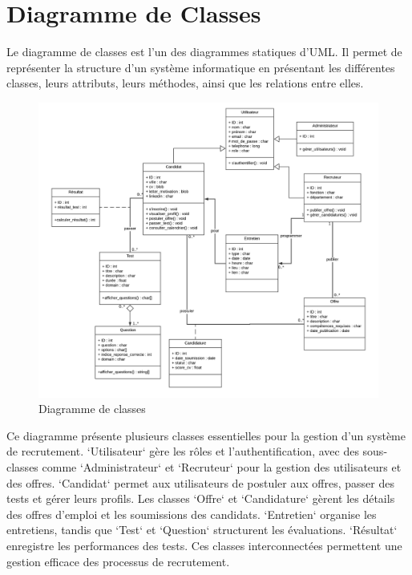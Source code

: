 \section{Diagramme de Classes}
Le diagramme de classes est l'un des diagrammes statiques d'UML. 
Il permet de représenter la structure d'un système informatique en 
présentant les différentes classes, leurs attributs, leurs méthodes, 
ainsi que les relations entre elles.

\begin{figure}[htbp]
   \centering
   \includegraphics[scale=0.6]{diag/class2.png} %
   \caption{Diagramme de classes}
   \label{fig:ClassDiag}
\end{figure}

Ce diagramme présente plusieurs classes essentielles pour la gestion d'un système de recrutement. `Utilisateur` gère les rôles et 
l'authentification, avec des sous-classes comme `Administrateur` et `Recruteur` pour la gestion des utilisateurs et des offres. `Candidat` 
permet aux utilisateurs de postuler aux offres, passer des tests et gérer leurs profils. Les classes `Offre` et `Candidature` gèrent les détails 
des offres d'emploi et les soumissions des candidats. `Entretien` organise les entretiens, tandis que `Test` et `Question` structurent 
les évaluations. `Résultat` enregistre les performances des tests. Ces classes interconnectées permettent une gestion efficace des processus 
de recrutement.
\vspace{3cm}

